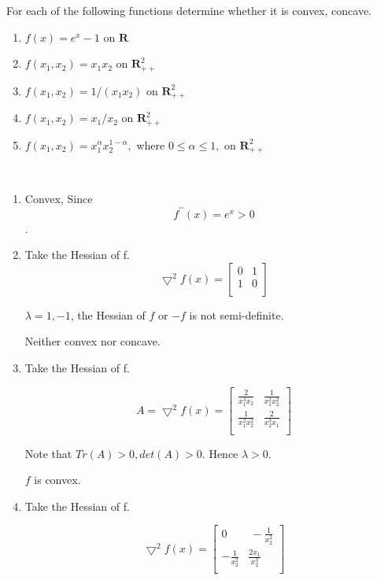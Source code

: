 {\begin{exercise}
For each of the following functions determine whether it is convex, concave.
\begin{enumerate}
\item{$f(x)=e^{x}-1$ on $\mathbf{R}$}
\item{$f\left(x_{1}, x_{2}\right)=x_{1} x_{2} \text { on } \mathbf{R}_{++}^{2}$}
\item{$f\left(x_{1}, x_{2}\right)=1 /\left(x_{1} x_{2}\right)$ on $\mathbf{R}_{++}^{2}$}
\item{$f\left(x_{1}, x_{2}\right)=x_{1} / x_{2}$ on $\mathbf{R}_{++}^{2}$}
\item{$f\left(x_{1}, x_{2}\right)=x_{1}^{\alpha} x_{2}^{1-\alpha},$ where $0 \leq \alpha \leq 1,$ on $\mathbf{R}_{++}^{2}$}
\end{enumerate}
\end{exercise}
\begin{solution}
\par{~}
\begin{enumerate}
\item{Convex, Since $$f^{\prime \prime}(x) = e^x > 0$$.}
\item{ Take the Hessian of f.
$$\bigtriangledown^2 f(x) = \begin{bmatrix}
0 & 1 \\
1 & 0 \\
\end{bmatrix}$$

$\lambda = 1,-1$, the Hessian of $f$ or $-f$ is not semi-definite.

Neither convex nor concave.
}

\item{ Take the Hessian of f.

$$ A = \bigtriangledown^2 f(x) = \begin{bmatrix}
\frac{2}{x_1^3 x_2} & \frac{1}{x_1^2 x_2^2} \\
\frac{1}{x_1^2 x_2^2} & \frac{2}{x_2^3 x_1} \\
\end{bmatrix}$$

Note that $Tr(A)>0, det(A)>0$. Hence $\lambda > 0$.

$f$ is convex.
}
\item{ Take the Hessian of f.

$$ \bigtriangledown^2 f(x) =
\begin{bmatrix}
0 & \ -\frac{1}{x_2^2} \\
-\frac{1}{ x_2^2} & \frac{2x_1}{x_2^3} \\
\end{bmatrix}
$$

}
\end{enumerate}
\end{solution}}
